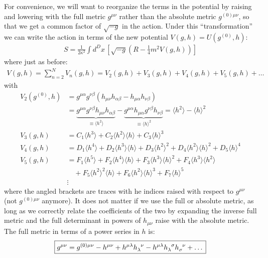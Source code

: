 \documentclass{book}
\theoremstyle{definition}
\newcommand{\nn}{\nonumber}
\newcommand{\f}[2]{\frac{#1}{#2}}
\newcommand{\lp}{\left(}
\newcommand{\rp}{\right)}
\newcommand{\lb}{\left[}
\newcommand{\rb}{\right]}
\begin{document}
For convenience, we will want to reorganize the terms in the potential by raising and lowering with the full metric $g^{\mu\nu}$ rather than the absolute metric $g^{(0)\mu\nu}$, so that we get a common factor of $\sqrt{-g}$ in the action. Under this ``transformation'' we can write the action in terms of the new potential $V(g,h) = U(g^{(0)},h)$:
\begin{align}
\boxed{S = \f{1}{2\kappa^2}\int d^Dx\, \lb \sqrt{-g}\lp R - \f{1}{4}m^2 V(g,h) \rp \rb}
\end{align}
where just as before:
\begin{align}
\boxed{V(g,h) = \sum^N_{n=2}V_n(g,h) = V_2(g,h) + V_3(g,h) + V_4(g,h) + V_5(g,h) + \dots}
\end{align}
with 
\begin{align}
V_2(g^{(0)},h) &= g^{\mu\alpha}g^{\nu\beta}\lp h_{\mu\nu}h_{\alpha\beta} - h_{\mu\alpha}h_{\nu\beta} \rp   \nn\\
&= \underbrace{g^{\mu\alpha}g^{\nu\beta}h_{\mu\nu}h_{\alpha\beta}}_{\equiv \langle h^2\rangle } - \underbrace{g^{\mu\alpha}h_{\mu\alpha}g^{\nu\beta}h_{\nu\beta}}_{\equiv \langle h \rangle ^2}= \langle h^2\rangle  - \langle h\rangle ^2\nn\\
V_3(g,h) &= C_1\langle h^3 \rangle  + C_2\langle h^2\rangle \langle h\rangle + C_3\langle h\rangle^3\nn\\
V_4(g,h) &= D_1\langle h^4\rangle  + D_2\langle h^3\rangle \langle h\rangle + D_3\langle h^2\rangle^2 + D_4\langle h^2\rangle\langle h\rangle^2 + D_5\langle h\rangle^4\nn\\
V_5(g,h) &= F_1\langle h^5\rangle  + F_2\langle h^4\rangle\langle h\rangle + F_3\langle h^3\rangle \langle h\rangle^2 + F_4\langle h^3\rangle\langle h^2\rangle\nn\\ &\,\,\,\,\,\,+ F_5\langle h^2\rangle^2\langle h\rangle + F_6\langle h^2\rangle\langle h\rangle^3 + F_7\langle h\rangle^5\nn\\
&\vdots
\end{align}
where the angled brackets are traces with he indices raised with respect to $g^{\mu\nu}$ (not $g^{(0)\mu\nu}$ anymore). It does not matter if we use the full or absolute metric, as long as we correctly relate the coefficients of the two by expanding the inverse full metric and the full determinant in powers of $h_{\mu\nu}$ raise with the absolute metric. The full metric in terms of a power series in $h$ is:
\begin{align}
\boxed{g^{\mu\nu} = g^{(0)\mu\nu} - h^{\mu\nu} + h^{\mu\lambda}\tensor{h}{_\lambda^\nu} - h^{\mu\lambda}\tensor{h}{_\lambda^\sigma}\tensor{h}{_\sigma^\nu} + \dots}
\end{align}
\end{document}
